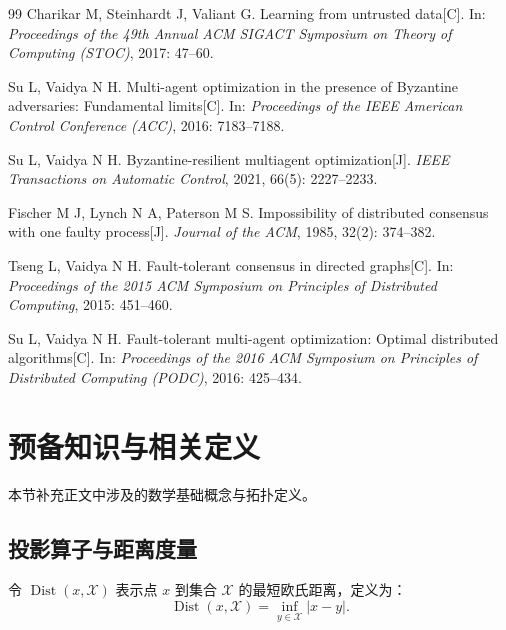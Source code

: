 \documentclass[12pt,hyperref,a4paper,UTF8]{ctexart}
\numberwithin{equation}{section}
\numberwithin{figure}{section}
\numberwithin{table}{section}
\begin{document}
\begin{thebibliography}{99}
Charikar M, Steinhardt J, Valiant G. Learning from untrusted data[C].
In: \textit{Proceedings of the 49th Annual ACM SIGACT Symposium on Theory of Computing (STOC)}, 2017: 47--60.

Su L, Vaidya N H. Multi-agent optimization in the presence of Byzantine adversaries: Fundamental limits[C].
In: \textit{Proceedings of the IEEE American Control Conference (ACC)}, 2016: 7183--7188.

Su L, Vaidya N H. Byzantine-resilient multiagent optimization[J].
\textit{IEEE Transactions on Automatic Control}, 2021, 66(5): 2227--2233.

Fischer M J, Lynch N A, Paterson M S. Impossibility of distributed consensus with one faulty process[J].
\textit{Journal of the ACM}, 1985, 32(2): 374--382.

Tseng L, Vaidya N H. Fault-tolerant consensus in directed graphs[C].
In: \textit{Proceedings of the 2015 ACM Symposium on Principles of Distributed Computing}, 2015: 451--460.

Su L, Vaidya N H. Fault-tolerant multi-agent optimization: Optimal distributed algorithms[C].
In: \textit{Proceedings of the 2016 ACM Symposium on Principles of Distributed Computing (PODC)}, 2016: 425--434.

\end{thebibliography}

\newpage
\appendix
\section{预备知识与相关定义}

\setcounter{figure}{0}
\renewcommand{\thefigure}{A\arabic{figure}}
\setcounter{table}{0}
  
\renewcommand{\thetable}{A\arabic{table}}
\setcounter{equation}{0}
\renewcommand{\theequation}{A\arabic{equation}}

\quad \quad 本节补充正文中涉及的数学基础概念与拓扑定义。

\subsection{投影算子与距离度量}
\quad \quad 令 $\operatorname{Dist}(x,\mathcal{X})$ 表示点 $x$ 到集合 $\mathcal{X}$ 的最短欧氏距离，定义为：
\begin{equation}
    \operatorname{Dist}(x,\mathcal{X}) = \inf_{y\in\mathcal{X}}|x-y|.
    \label{eq:dist_app}
\end{equation}
\end{document}
